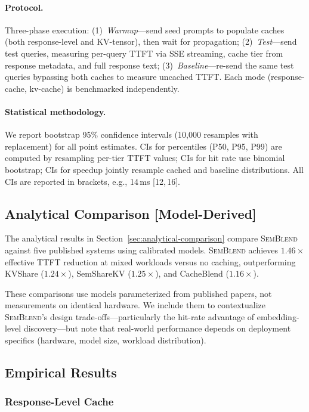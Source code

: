 \documentclass[11pt,twocolumn]{article}
\newcommand{\semblend}{\textsc{SemBlend}\xspace}
\newcommand{\ci}[2]{\scriptsize{[#1,\,#2]}}
\begin{document}
\paragraph{Protocol.} Three-phase execution: (1)~\emph{Warmup}---send
seed prompts to populate caches (both response-level and KV-tensor),
then wait for propagation; (2)~\emph{Test}---send test queries,
measuring per-query TTFT via SSE streaming, cache tier from response
metadata, and full response text; (3)~\emph{Baseline}---re-send the
same test queries bypassing both caches to measure uncached TTFT.
Each mode (response-cache, kv-cache) is benchmarked independently.

\paragraph{Statistical methodology.} We report bootstrap 95\%
confidence intervals (10,000 resamples with replacement) for all
point estimates. CIs for percentiles (P50, P95, P99) are computed
by resampling per-tier TTFT values; CIs for hit rate use binomial
bootstrap; CIs for speedup jointly resample cached and baseline
distributions. All CIs are reported in brackets, e.g.,
14\,ms \ci{12}{16}.


\subsection{Analytical Comparison [Model-Derived]}
\label{sec:competitive}

The analytical results in Section~\ref{sec:analytical-comparison}
compare \semblend against five published systems using calibrated
models. \semblend achieves $1.46\times$ effective TTFT reduction at
mixed workloads versus no caching, outperforming KVShare ($1.24\times$),
SemShareKV ($1.25\times$), and CacheBlend ($1.16\times$).

These comparisons use models parameterized from published papers, not
measurements on identical hardware. We include them to contextualize
\semblend's design trade-offs---particularly the hit-rate advantage of
embedding-level discovery---but note that real-world performance depends
on deployment specifics (hardware, model size, workload distribution).


\subsection{Empirical Results}
\label{sec:empirical}

\subsubsection{Response-Level Cache}
\label{sec:response-results}
\end{document}
